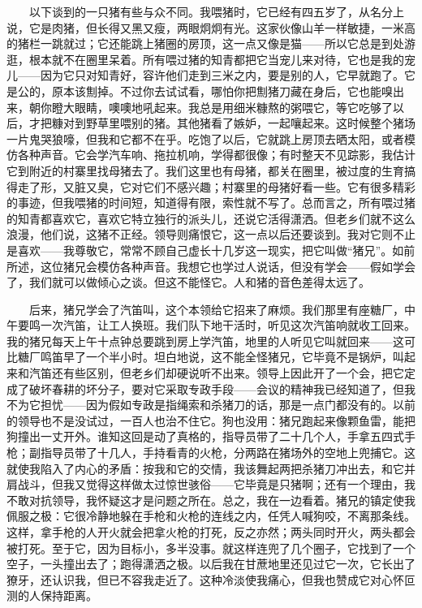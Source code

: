 　　以下谈到的一只猪有些与众不同。我喂猪时，它已经有四五岁了，从名分上说，它是肉猪，但长得又黑又瘦，两眼炯炯有光。这家伙像山羊一样敏捷，一米高的猪栏一跳就过；它还能跳上猪圈的房顶，这一点又像是猫——所以它总是到处游逛，根本就不在圈里呆着。所有喂过猪的知青都把它当宠儿来对待，它也是我的宠儿——因为它只对知青好，容许他们走到三米之内，要是别的人，它早就跑了。它是公的，原本该劁掉。不过你去试试看，哪怕你把劁猪刀藏在身后，它也能嗅出来，朝你瞪大眼睛，噢噢地吼起来。我总是用细米糠熬的粥喂它，等它吃够了以后，才把糠对到野草里喂别的猪。其他猪看了嫉妒，一起嚷起来。这时候整个猪场一片鬼哭狼嚎，但我和它都不在乎。吃饱了以后，它就跳上房顶去晒太阳，或者模仿各种声音。它会学汽车响、拖拉机响，学得都很像；有时整天不见踪影，我估计它到附近的村寨里找母猪去了。我们这里也有母猪，都关在圈里，被过度的生育搞得走了形，又脏又臭，它对它们不感兴趣；村寨里的母猪好看一些。它有很多精彩的事迹，但我喂猪的时间短，知道得有限，索性就不写了。总而言之，所有喂过猪的知青都喜欢它，喜欢它特立独行的派头儿，还说它活得潇洒。但老乡们就不这么浪漫，他们说，这猪不正经。领导则痛恨它，这一点以后还要谈到。我对它则不止是喜欢——我尊敬它，常常不顾自己虚长十几岁这一现实，把它叫做“猪兄”。如前所述，这位猪兄会模仿各种声音。我想它也学过人说话，但没有学会——假如学会了，我们就可以做倾心之谈。但这不能怪它。人和猪的音色差得太远了。

　　后来，猪兄学会了汽笛叫，这个本领给它招来了麻烦。我们那里有座糖厂，中午要鸣一次汽笛，让工人换班。我们队下地干活时，听见这次汽笛响就收工回来。我的猪兄每天上午十点钟总要跳到房上学汽笛，地里的人听见它叫就回来——这可比糖厂鸣笛早了一个半小时。坦白地说，这不能全怪猪兄，它毕竟不是锅炉，叫起来和汽笛还有些区别，但老乡们却硬说听不出来。领导上因此开了一个会，把它定成了破坏春耕的坏分子，要对它采取专政手段——会议的精神我已经知道了，但我不为它担忧——因为假如专政是指绳索和杀猪刀的话，那是一点门都没有的。以前的领导也不是没试过，一百人也治不住它。狗也没用：猪兄跑起来像颗鱼雷，能把狗撞出一丈开外。谁知这回是动了真格的，指导员带了二十几个人，手拿五四式手枪；副指导员带了十几人，手持看青的火枪，分两路在猪场外的空地上兜捕它。这就使我陷入了内心的矛盾：按我和它的交情，我该舞起两把杀猪刀冲出去，和它并肩战斗，但我又觉得这样做太过惊世骇俗——它毕竟是只猪啊；还有一个理由，我不敢对抗领导，我怀疑这才是问题之所在。总之，我在一边看着。猪兄的镇定使我佩服之极：它很冷静地躲在手枪和火枪的连线之内，任凭人喊狗咬，不离那条线。这样，拿手枪的人开火就会把拿火枪的打死，反之亦然；两头同时开火，两头都会被打死。至于它，因为目标小，多半没事。就这样连兜了几个圈子，它找到了一个空子，一头撞出去了；跑得潇洒之极。以后我在甘蔗地里还见过它一次，它长出了獠牙，还认识我，但已不容我走近了。这种冷淡使我痛心，但我也赞成它对心怀叵测的人保持距离。

